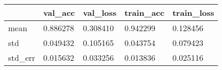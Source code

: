 \begin{tabular}{|l|l|l|l|l|}
\toprule \hline
 & val\_acc & val\_loss & train\_acc & train\_loss \\ \hline
\midrule
mean & 0.886278 & 0.308410 & 0.942299 & 0.128456 \\ \hline
std & 0.049432 & 0.105165 & 0.043754 & 0.079423 \\ \hline
std\_err & 0.015632 & 0.033256 & 0.013836 & 0.025116 \\ \hline
\bottomrule
\end{tabular}

